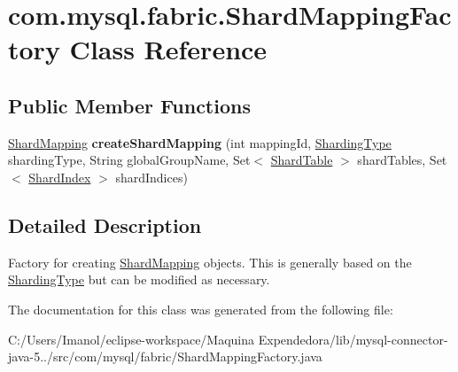 \hypertarget{classcom_1_1mysql_1_1fabric_1_1_shard_mapping_factory}{}\section{com.\+mysql.\+fabric.\+Shard\+Mapping\+Factory Class Reference}
\label{classcom_1_1mysql_1_1fabric_1_1_shard_mapping_factory}
\subsection*{Public Member Functions}
\begin{DoxyCompactItemize}
\item 
\mbox{\label{classcom_1_1mysql_1_1fabric_1_1_shard_mapping_factory_a4894ee118aaaea0025f8271ceb78ebe1}} 
\mbox{\hyperlink{classcom_1_1mysql_1_1fabric_1_1_shard_mapping}{Shard\+Mapping}} {\bfseries create\+Shard\+Mapping} (int mapping\+Id, \mbox{\hyperlink{enumcom_1_1mysql_1_1fabric_1_1_sharding_type}{Sharding\+Type}} sharding\+Type, String global\+Group\+Name, Set$<$ \mbox{\hyperlink{classcom_1_1mysql_1_1fabric_1_1_shard_table}{Shard\+Table}} $>$ shard\+Tables, Set$<$ \mbox{\hyperlink{classcom_1_1mysql_1_1fabric_1_1_shard_index}{Shard\+Index}} $>$ shard\+Indices)
\end{DoxyCompactItemize}


\subsection{Detailed Description}
Factory for creating \mbox{\hyperlink{classcom_1_1mysql_1_1fabric_1_1_shard_mapping}{Shard\+Mapping}} objects. This is generally based on the \mbox{\hyperlink{enumcom_1_1mysql_1_1fabric_1_1_sharding_type}{Sharding\+Type}} but can be modified as necessary. 

The documentation for this class was generated from the following file\+:\begin{DoxyCompactItemize}
\item 
C\+:/\+Users/\+Imanol/eclipse-\/workspace/\+Maquina Expendedora/lib/mysql-\/connector-\/java-\/5../src/com/mysql/fabric/Shard\+Mapping\+Factory.\+java\end{DoxyCompactItemize}
